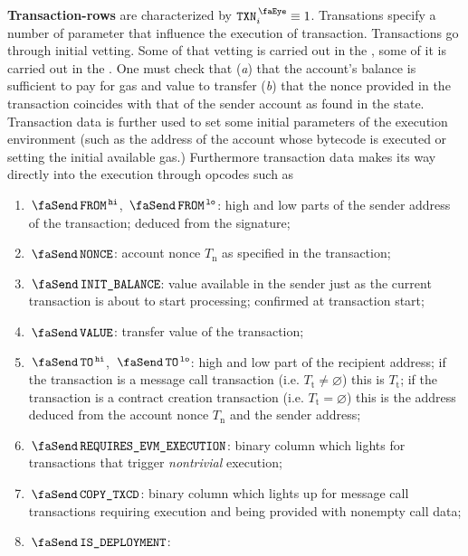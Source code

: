 \textbf{Transaction-rows} are characterized by $\peekTransaction_{i} \equiv 1$.
Transations specify a number of parameter that influence the execution of transaction.
Transactions go through initial vetting.
Some of that vetting is carried out in the \hubMod{}, some of it is carried out in the \userTxnDataMod{}.
One must check that
(\emph{a}) that the account's balance is sufficient to pay for gas and value to transfer
(\emph{b}) that the nonce provided in the transaction coincides with that of the sender account as found in the state.
Transaction data is further used to set some initial parameters of the execution environment (such as the address of the account whose bytecode is executed or setting the initial available gas.)
Furthermore transaction data makes its way directly into the execution through opcodes such as \inst{}
\begin{enumerate}
	\item
		\godGiven{}
		$\txFrom\high$, $\txFrom\low$:
		high and low parts of the sender address of the transaction; deduced from the signature;
	\item
		\godGiven{}
		$\txNonce$:
		account nonce $T_\text{n}$ as specified in the transaction;
	\item
		\godGiven{}
		\markAsJustifiedHere{}
		$\txInitialBalance$:
		value available in the sender just as the current transaction is about to start processing; confirmed at transaction start;
	\item
		\godGiven{}
		$\txValue$:
		transfer value of the transaction;
	\item
		\godGiven{}
		$\txTo\high$, $\txTo\low$:
		high and low part of the recipient address;
		if the transaction is a message call transaction (i.e. $T_{\text{t}} \neq \varnothing$) this is $T_{\text{t}}$;
		if the transaction is a contract creation transaction (i.e. $T_{\text{t}} = \varnothing$) this is the address deduced from the account nonce $T_\text{n}$ and the sender address;
	\item
		\godGiven{}
		\markAsPartiallyJustifiedHere{}
		$\txRequiresEvmExecution$:
		binary column which lights for transactions that trigger \emph{nontrivial} \evm{} execution;
	\item
		\godGiven{}
		$\txCopyTxcd$:
		binary column which lights up for message call transactions requiring \evm{} execution and being provided with nonempty call data;
	\item
		\godGiven{}
		$\txIsDeployment$:

\end{enumerate}
